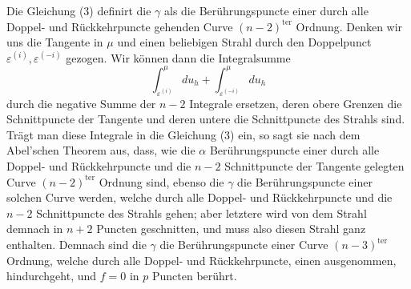 \documentclass[10pt]{article}
\begin{document}
Die Gleichung (3) definirt die \(\gamma\) als die Berührungspuncte einer durch alle Doppel- und Rückkehrpuncte gehenden Curve \((n-2)^{\mathrm{ter}}\) Ordnung. Denken wir uns die Tangente in \(\mu\) und einen beliebigen Strahl durch den Doppelpunct \(\varepsilon^{(i)},\varepsilon^{(-i)}\) gezogen. Wir können dann die Integralsumme
\[
\int_{\varepsilon^{(i)}}^{\mu}du_h+
\int_{\varepsilon^{(-i)}}^{\mu}du_h
\]
durch die negative Summe der \(n-2\) Integrale ersetzen, deren obere Grenzen die Schnittpuncte der Tangente und deren untere die Schnittpuncte des Strahls sind. Trägt man diese Integrale in die Gleichung (3) ein, so sagt sie nach dem Abel'schen Theorem aus, dass, wie die \(\alpha\) Berührungspuncte einer durch alle Doppel- und Rückkehrpuncte und die \(n-2\) Schnittpuncte der Tangente gelegten Curve \((n-2)^{\mathrm{ter}}\) Ordnung sind, ebenso die \(\gamma\) die Berührungspuncte einer solchen Curve werden, welche durch alle Doppel- und Rückkehrpuncte und die \(n-2\) Schnittpuncte des Strahls gehen; aber letztere wird von dem Strahl demnach in \(n+2\) Puncten geschnitten, und muss also diesen Strahl ganz enthalten. Demnach sind die \(\gamma\) die Berührungspuncte einer Curve \((n-3)^{\mathrm{ter}}\) Ordnung, welche durch alle Doppel- und Rückkehrpuncte, einen ausgenommen, hindurchgeht, und \(f=0\) in \(p\) Puncten berührt.
\end{document}
